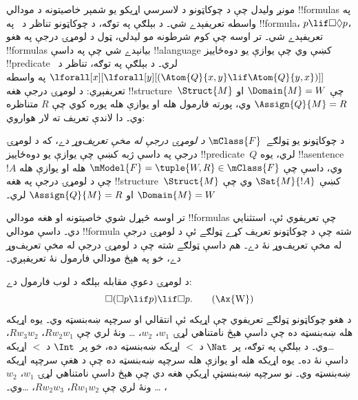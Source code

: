 \documentclass[../../../include/open-logic-section]{subfiles}
\begin{document}


مونږ وليدل چې د چوکاټونو د لاسرسي اړيکو يو شمېر خاصيتونه د مودالي
!!{formula}s په واسطه تعريفېدے شي۔ د بېلګې په توګه، د چوکاټونو
تناظر د~ په !!{formula}، $p \lif \Box\Diamond
p$، تعريفېدے شي۔ تر اوسه چې کوم شرطونه مو ليدلي، ټول د لومړۍ درجې
په هغو !!{formula}s بيانېدے شي چې په داسې !!a{language} کښې وي
چې يوازې يو دوه‌ځاييز !!{predicate} لري۔ د بېلګې په توګه، تناظر
د~$\lforall[x][\lforall[y][(\Atom{Q}{x,y} \lif \Atom{Q}{y, x})]]$
په واسطه تعريفېږي: د لومړۍ درجې هغه !!{structure}~$\Struct{M}$
چې $\Domain{M} = W$ او $\Assign{Q}{M} = R$ وي، پورته فارمول
هله او يوازې هله پوره کوي چې $R$ متناظره وي۔ دا لاندې تعريف ته
لار هواروي:

\begin{defn}
  د چوکاټونو يو ټولګے~$\mClass{F}$ \emph{د لومړۍ درجې له مخې
  تعريف‌وړ} دے، که د لومړۍ درجې په داسې ژبه کښې چې يوازې يو
  دوه‌ځاييز !!{predicate}~$Q$ لري، يوه !!a{sentence}~$!A$ وي،
  داسې چې $\mModel{F} =
  \tuple{W, R} \in \mClass{F}$ هله او يوازې هله چې د لومړۍ درجې
  په هغه !!{structure}~$\Struct{M}$ کښې $\Sat{M}{!A}$ وي چې
  $\Domain{M} = W$ او $\Assign{Q}{M}
  = R$ لري۔
\end{defn}

تر اوسه څېړل شوي خاصيتونه او هغه مودالي !!{formula}s چې تعريفوي
ئې، استثنايي دي۔ داسې مودالي !!{formula} شته چې د چوکاټونو
تعريف کړے ټولګے ئې د لومړۍ درجې له مخې تعريف‌وړ نۀ دے۔ هم داسې
ټولګے شته چې د لومړۍ درجې له مخې تعريف‌وړ دے، خو په هېڅ مودالي
فارمول نۀ تعريفېږي۔

د لومړۍ دعوې مقابله بېلګه د لوب فارمول دے:
\begin{equation}
\Box(\Box p \lif p) \lif \Box p. \tag{\Ax{W}}
\end{equation}
 د هغو چوکاټونو ټولګے تعريفوي چې اړيکه ئې انتقالي او
سرچپه ښه‌بنسټه وي۔ يوه اړيکه هله ښه‌بنسټه ده چې داسې هېڅ
نامتناهي لړۍ $w_1$، $w_2$، \dots{} ونۀ لري چې $Rw_2w_1$،
$Rw_3w_2$، \dots وي۔ د بېلګې په توګه، پر~$\Nat$ د $<$ اړيکه
ښه‌بنسټه ده، خو پر~$\Int$ د $<$ اړيکه داسې نۀ ده۔ يوه اړيکه هله
او يوازې هله سرچپه ښه‌بنسټه ده چې د هغې سرچپه اړيکه
ښه‌بنسټه وي۔ نو سرچپه ښه‌بنسټې اړيکې هغه دي چې هېڅ داسې نامتناهي
لړۍ $w_1$، $w_2$، \dots{} ونۀ لري چې $Rw_1w_2$،
$Rw_2w_3$، \dots وي۔
\end{document}
